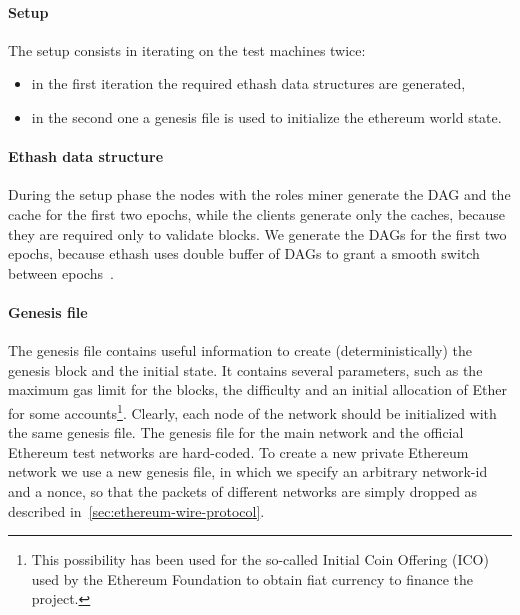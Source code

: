 \paragraph{Setup}
The setup consists in iterating on the test machines twice:
\begin{itemize}
  \item in the first iteration the required ethash data structures are generated,
  \item in the second one a genesis file is used to initialize the ethereum world
  state.
\end{itemize}


\paragraph{Ethash data structure}
During the setup phase the nodes with the roles miner generate the DAG and the
cache for the first two epochs, while the clients generate only the caches,
because they are required only to validate blocks. We generate the DAGs for the
first two epochs, because ethash uses double buffer of DAGs to grant a smooth
switch between epochs~\cite{bib:dagger-hashimoto}.


\paragraph{Genesis file}
The genesis file contains useful information to create (deterministically) the
genesis block and the initial state. It contains several parameters, such as the
maximum gas limit for the blocks, the difficulty and an initial allocation of
Ether for some accounts\footnote{This possibility has been used for the
so-called Initial Coin Offering (ICO) used by the Ethereum Foundation to obtain
fiat currency to finance the project.}. Clearly, each node of the network should
be initialized with the same genesis file. The genesis file for the main network
and the official Ethereum test networks are hard-coded. To create a new private
Ethereum network we use a new genesis file, in which we specify an arbitrary
network-id and a nonce, so that the packets of different networks are simply
dropped as described in~\autoref{sec:ethereum-wire-protocol}. 

\begin{figure}[H]
    
\end{figure}

